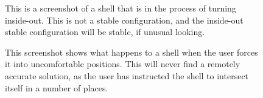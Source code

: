 \documentclass{thesis}
\begin{document}
\begin{figure}
\caption[Transient error]{This is a screenshot of a shell that is in the process of turning inside-out.  This is not a
stable configuration, and the inside-out stable configuration will be stable, if unusual looking.}
\label{fig:inside_out_transient}
\end{figure}

\begin{figure}
\caption[A tangled mess]{This screenshot shows what happens to a shell when the user forces it into uncomfortable positions.
This will never find a remotely accurate solution, as the user has instructed the shell to intersect itself in a number of
places.}
\label{fig:tangle1}
\end{figure}
\end{document}
